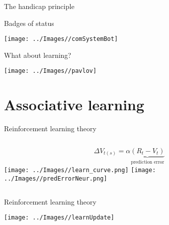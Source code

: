 \documentclass[
  ignorenonframetext,
]{beamer}
\begin{document}
\begin{frame}{The handicap principle}
\protect\hypertarget{the-handicap-principle-1}{}

\begin{block}{Badges of status}

\begin{center}\texttt{[image: ../Images//comSystemBot]} \end{center}

\end{block}

\end{frame}

\begin{frame}{What about learning?}
\protect\hypertarget{what-about-learning}{}

\begin{center}\texttt{[image: ../Images//pavlov]} \end{center}

\end{frame}

\hypertarget{associative-learning}{%
\section{Associative learning}\label{associative-learning}}

\begin{frame}{Reinforcement learning theory}
\protect\hypertarget{reinforcement-learning-theory}{}

\begin{columns}[T]
 \begin{equation*}
  \Delta V_{t(s)}=\alpha \underbrace{(R_t-V_t)}_\text{prediction error}
  \end{equation*}
  \pause
  \texttt{[image: ../Images//learn\_curve.png]}
  \pause
  \texttt{[image: ../Images//predErrorNeur.png]}
\end{columns}

\end{frame}

\begin{frame}{Reinforcement learning theory}
\protect\hypertarget{reinforcement-learning-theory-1}{}

\begin{center}\texttt{[image: ../Images//learnUpdate]} \end{center}

\end{frame}
\end{document}
